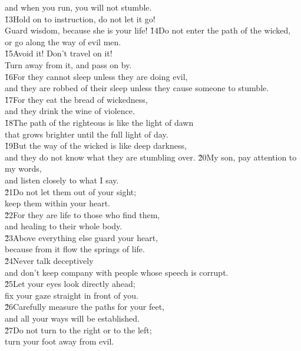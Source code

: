 \begin{poetry}
\poemll    and when you run, you will not stumble. \\
\poeml \v{13}Hold on to instruction, do not let it go! \\
\poemll    Guard wisdom, because she is your life!
\poeml \v{14}Do not enter the path of the wicked, \\
\poemll    or go along the way of evil men. \\
\poeml \v{15}Avoid it! Don't travel on it! \\
\poemll    Turn away from it, and pass on by. \\
\poeml \v{16}For they cannot sleep unless they are doing evil, \\
\poemll    and they are robbed of their sleep unless they cause someone to stumble. \\
\poeml \v{17}For they eat the bread of wickedness, \\
\poemll    and they drink the wine of violence. \\
\poeml \v{18}The path of the righteous is like the light of dawn \\
\poemll    that grows brighter until the full light of day. \\
\poeml \v{19}But the way of the wicked is like deep darkness, \\
\poemll    and they do not know what they are stumbling over.
\poeml \v{20}My son, pay attention to my words, \\
\poemll    and listen closely to what I say. \\
\poeml \v{21}Do not let them out of your sight; \\
\poemll    keep them within your heart. \\
\poeml \v{22}For they are life to those who find them, \\
\poemll    and healing to their whole body. \\
\poeml \v{23}Above everything else guard your heart, \\
\poemll    because from it flow the springs of life. \\
\poeml \v{24}Never talk deceptively \\
\poemll    and don't keep company with people whose speech is corrupt. \\
\poeml \v{25}Let your eyes look directly ahead; \\
\poemll    fix your gaze straight in front of you. \\
\poeml \v{26}Carefully measure the paths for your feet, \\
\poemll    and all your ways will be established. \\
\poeml \v{27}Do not turn to the right or to the left; \\
\poemll    turn your foot away from evil.
\end{poetry}

